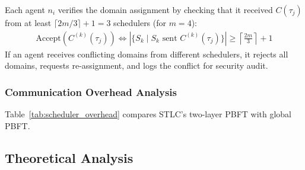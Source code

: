 \documentclass[manuscript,screen,review]{acmart}
\begin{document}
Each agent $n_i$ verifies the domain assignment by checking that it received $C(\tau_j)$ from at least $\lceil 2m/3 \rceil + 1 = 3$ schedulers (for $m=4$):
\begin{equation}
\begin{aligned}
\text{Accept}(C^{(k)}(\tau_j)) \iff
|\{S_k \mid S_k \text{ sent } C^{(k)}(\tau_j)\}| \geq
\left\lceil \frac{2m}{3} \right\rceil + 1
\label{eq:domain_verification}
\end{aligned}
\end{equation}
If an agent receives conflicting domains from different schedulers, it rejects all domains, requests re-assignment, and logs the conflict for security audit.

\subsubsection{Communication Overhead Analysis}
\label{sec:scheduler_overhead}

Table~\ref{tab:scheduler_overhead} compares STLC's two-layer PBFT with global PBFT.

\begin{table}[h]
\centering
\caption{Communication Overhead: STLC ($m=4$, emulation) vs.\ Global PBFT}
\label{tab:scheduler_overhead}
\small
{}
\end{table}

\subsection{Theoretical Analysis}
\label{sec:theoretical}
\end{document}
